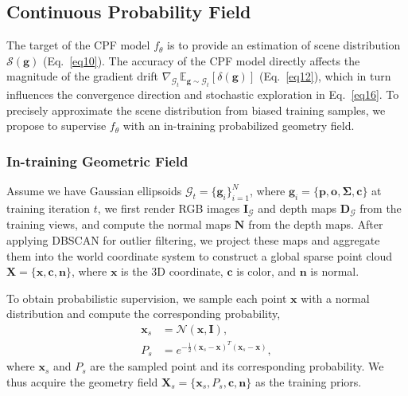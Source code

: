 \documentclass[lettersize,journal]{IEEEtran}
\begin{document}
\subsection{Continuous Probability Field}\label{sec:cpf}

The target of the CPF model $f_{\theta}$ is to provide 
an estimation of scene distribution $\mathcal{S}(\mathbf{g})$ (Eq.~\ref{eq10}).
The accuracy of the CPF model directly affects the magnitude of the gradient drift $\nabla_{\mathcal{G}_t} \mathbb{E}_{\mathbf{g} \sim \mathcal{G}_t} \left[ \delta(\mathbf{g}) \right]$ (Eq.~\ref{eq12}), which in turn influences the convergence direction and stochastic exploration in Eq.~\ref{eq16}.
To precisely approximate the scene distribution from biased training samples, we propose to supervise $f_{\theta}$ with an in-training probabilized geometry field.

\subsubsection{In-training Geometric Field}

Assume we have Gaussian ellipsoids 
$\mathcal{G}_t = \{\mathbf{g}_i\}_{i=1}^N$, where $\mathbf{g}_i = \{ \mathbf{p}, \mathbf{o}, \mathbf{\Sigma}, \mathbf{c} \}$ 
at training iteration $t$, we first render RGB images $\mathbf{I}_{\mathcal{G}}$ and depth maps $\mathbf{D}_{\mathcal{G}}$ from the training views, and compute the normal maps $\mathbf{N}$ from the depth maps. After applying DBSCAN for outlier filtering, we project these maps and aggregate them into the world coordinate system to construct a global sparse point cloud $\mathbf{X} = \{ \mathbf{x}, \mathbf{c}, \mathbf{n} \}$, where $\mathbf{x}$ is the 3D coordinate, $\mathbf{c}$ is color, and $\mathbf{n}$ is normal.

To obtain probabilistic supervision, we sample each point $\mathbf{x}$ with a normal distribution and compute the corresponding probability,
\begin{align}
    \mathbf{x}_{s} &= \mathcal{N}(\mathbf{x}, \mathbf{I}) \label{eq19}, \\
    P_{s} &= e^{-\frac{1}{2} \left( \mathbf{x}_{s} - \mathbf{x} \right)^{T} \left( \mathbf{x}_{s} - \mathbf{x} \right)}, \label{eq20}
\end{align}
where $\mathbf{x}_{s}$ and $P_{s}$ are the sampled point and its corresponding probability. We thus acquire the geometry field $\mathbf{X}_{s} = \{ \mathbf{x}_{s}, P_{s}, \mathbf{c}, \mathbf{n} \}$ as the training priors.
\end{document}
